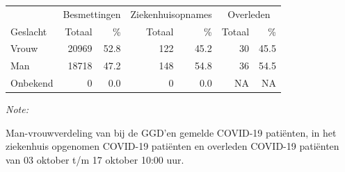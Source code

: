 \documentclass[
  english,
  man,floatsintext]{apa6}
\begin{document}
\begin{table}
\centering\begingroup\fontsize{11}{13}\selectfont

\begin{threeparttable}
\begin{tabular}{lrrrrrr}
\toprule
\multicolumn{1}{c}{ } & \multicolumn{2}{c}{Besmettingen} & \multicolumn{2}{c}{Ziekenhuisopnames} & \multicolumn{2}{c}{Overleden} \\
\cmidrule(l{3pt}r{3pt}){2-3} \cmidrule(l{3pt}r{3pt}){4-5} \cmidrule(l{3pt}r{3pt}){6-7}
Geslacht & Totaal & \% & Totaal & \% & Totaal & \%\\
\midrule
Vrouw & 20969 & 52.8 & 122 & 45.2 & 30 & 45.5\\
Man & 18718 & 47.2 & 148 & 54.8 & 36 & 54.5\\
Onbekend & 0 & 0.0 & 0 & 0.0 & NA & NA\\
\bottomrule
\end{tabular}
\begin{tablenotes}
\item \textit{Note: } 
\item Man-vrouwverdeling van bij de GGD’en gemelde COVID-19 patiënten, in het ziekenhuis opgenomen COVID-19 patiënten en overleden COVID-19 patiënten van 03 oktober t/m 17 oktober 10:00 uur.
\end{tablenotes}
\end{threeparttable}
\endgroup{}
\end{table}
\newpage
\end{document}

